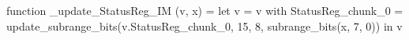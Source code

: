 function _update_StatusReg_IM (v, x) = let v = { v with StatusReg_chunk_0 = update_subrange_bits(v.StatusReg_chunk_0, 15, 8, subrange_bits(x, 7, 0)) } in
  v
